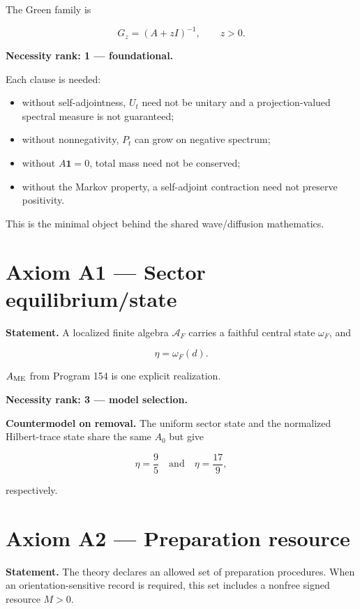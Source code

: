 \documentclass[11pt,a4paper,openany]{report}
\begin{document}
The Green family is

\[
G_z=(A+zI)^{-1},\qquad z>0.
\]

\textbf{Necessity rank: 1 --- foundational.}

Each clause is needed:

\begin{itemize}
\item 
without self-adjointness, \(U_t\) need not be unitary and a projection-valued spectral measure is not guaranteed;

\item 
without nonnegativity, \(P_t\) can grow on negative spectrum;

\item 
without \(A\mathbf1=0\), total mass need not be conserved;

\item 
without the Markov property, a self-adjoint contraction need not preserve positivity.

\end{itemize}

This is the minimal object behind the shared wave/\allowbreak{}diffusion mathematics.

\section{Axiom A1 --- Sector equilibrium/\allowbreak{}state}

\textbf{Statement.} A localized finite algebra \(\mathcal A_F\) carries a faithful central state \(\omega_F\), and

\[
\eta=\omega_F(d).
\]

\(A_{\rm ME}\) from Program 154 is one explicit realization.

\textbf{Necessity rank: 3 --- model selection.}

\textbf{Countermodel on removal.} The uniform sector state and the normalized Hilbert-trace state share the same \(A_0\) but give

\[
\eta=\frac95
\quad\text{and}\quad
\eta=\frac{17}{9},
\]

respectively.

\section{Axiom A2 --- Preparation resource}

\textbf{Statement.} The theory declares an allowed set of preparation procedures. When an orientation-sensitive record is required, this set includes a nonfree signed resource \(M>0\).
\end{document}
